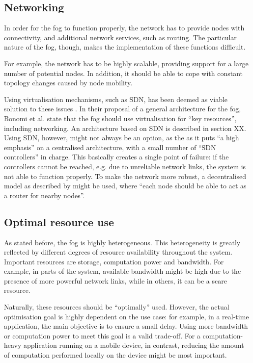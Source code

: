 \documentclass{article}
\begin{document}
\subsection{Networking}
In order for the fog to function properly, the network has to provide nodes with connectivity, and additional network services, such as routing. The particular nature of the fog, though, makes the implementation of these functions difficult. 

For example, the network has to be highly scalable, providing support for a large number of potential nodes. In addition, it should be able to cope with constant topology changes caused by node mobility.

Using virtualisation mechanisms, such as SDN, has been deemed as viable solution to these issues \cite{yi2015survey}. In their proposal of a general architecture for the fog, Bonomi et al. \cite{bonomi2014fog} state that the fog should use virtualisation for ``key resources'', including networking. An architecture based on SDN is described in section XX. Using SDN, however, might not always be an option, as the as it puts ``a high emphasis'' \cite{peng2016fog} on a centralised architecture, with a small number of ``SDN controllers'' in charge. This basically creates a single point of failure: if the controllers cannot be reached, e.g. due to unreliable network links, the system is not able to function properly. To make the network more robust, a decentralised model as described by \cite{yi2015survey} might be used, where  ``each node should be able to act as a router for nearby nodes''. 

\subsection{Optimal resource use}
\label{sub_opt_res_use}

As stated before, the fog is highly heterogeneous. This heterogeneity is greatly reflected by different degrees of resource availability throughout the system. Important resources are storage, computation power and bandwidth. For example, in parts of the system, available bandwidth might be high due to the presence of more powerful network links, while in others, it can be a scare resource.

Naturally, these resources should be ``optimally'' used. However, the actual optimisation goal is highly dependent on the use case: for example, in a real-time application, the main objective is to ensure a small delay. Using more bandwidth or computation power to meet this goal is a valid trade-off. For a computation-heavy application running on a mobile device, in contrast, reducing the amount of computation performed locally on the device might be most important.
\end{document}
